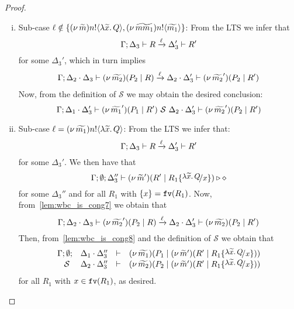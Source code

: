 \begin{proof}
\begin{enumerate}[I.]
\begin{enumerate}[1.]
				\begin{enumerate}[i.]
					\item Sub-case 	$\ell \notin \{(\nu\, \widetilde{m}) n ! \langle \lambda \widetilde{x}.\,Q \rangle, (\nu\, \widetilde{mm_1}) n ! \langle \widetilde{m_1} \rangle\}$: From the LTS we infer that 
							\[
								\Gamma; \Delta_3 \vdash R \xrightarrow{\ell} \Delta_3' \vdash R'
							\]
						for some $\Delta_3'$, which in turn implies
							\begin{eqnarray*}
								\Gamma; \Delta_2 \cdot \Delta_3 \vdash (\nu\, \widetilde{m_2})(P_2 \;|\; R) \xrightarrow{\ell} \Delta_2 \cdot \Delta_3' \vdash (\nu\, \widetilde{m_2}')(P_2 \;|\; R')
							\end{eqnarray*}
						Now, from the definition of $\mathcal{S}$ we may obtain the desired conclusion:
							\[
								\Gamma; \Delta_1 \cdot \Delta_3' \vdash (\nu\, \widetilde{m_1}')(P_1 \;|\; R') \ \mathcal{S}\  \Delta_2 \cdot \Delta_3' \vdash (\nu\, \widetilde{m_2}')(P_2 \;|\; R')
							\]

				\item	Sub-case $\ell = (\nu\, \widetilde{m_1}) n ! \langle \lambda \widetilde{x}.\,Q \rangle$:
					From the LTS we infer that:
						\begin{equation}
						\Gamma; \Delta_3 \vdash R \xrightarrow{\ell} \Delta_3' \vdash R'
								\label{lem:wbc_is_cong7}
						\end{equation}
						for some $\Delta_3'$. We then have that 
						\begin{equation}
	\Gamma; \emptyset; \Delta_3'' \proves \newsp{\widetilde{m}'}{R' \Par R_1 \subst{\abs{\widetilde{x}}{Q}}{x}} \hastype \Proc
								\label{lem:wbc_is_cong8}
						\end{equation}
						for some $\Delta_3''$ and for all $R_1$ with $\{x\} = \mathtt{fv}(R_1)$. Now, from~\eqref{lem:wbc_is_cong7} we obtain that
						\[
							\Gamma; \Delta_2 \cdot \Delta_3 \vdash (\nu\, \widetilde{m_2}')(P_2 \;|\; R) \xrightarrow{\ell} \Delta_2 \cdot \Delta_3' \vdash (\nu\, \widetilde{m_2})(P_2 \;|\; R')
						\]
						Then, from~\eqref{lem:wbc_is_cong8} and the definition of $\mathcal{S}$ we obtain that						\[
							\mhorel{\Gamma}{\Delta_1 \cat \Delta_3''}{\newsp{\widetilde{m_1}}{P_1 \Par \newsp{\widetilde{m}'}{R' \Par R_1 \subst{\abs{\widetilde{x}}{Q}}{x}}}}
							{\ \mathcal{S}\ }
							{\Delta_2 \cdot \Delta_3''}{}{\newsp{\widetilde{m_2}}{P_2 \Par \newsp{\widetilde{m}'}{R' \Par R_1 \subst{\abs{\widetilde{x}}{Q}}{x}}}}
						\]
						 for all $R_1$ with $x \in \mathtt{fv}(R_1)$, as desired. \\


\end{enumerate}
\end{enumerate}
\end{enumerate}
\end{proof}
